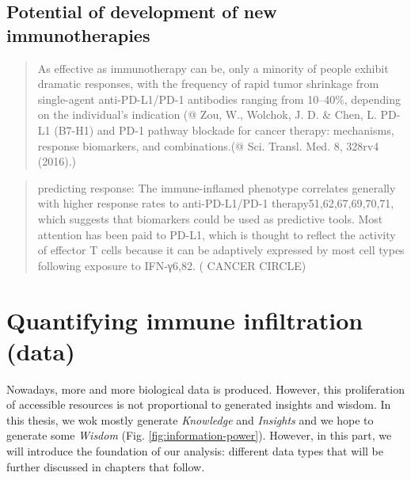 \documentclass[12pt,]{book}
\theoremstyle{definition}
\theoremstyle{definition}
\theoremstyle{definition}
\theoremstyle{remark}
\begin{document}
\hypertarget{potential-of-development-of-new-immunotherapies}{%
\subsection{Potential of development of new
immunotherapies}\label{potential-of-development-of-new-immunotherapies}}

\begin{quote}
As effective as immunotherapy can be, only a minority of people exhibit
dramatic responses, with the frequency of rapid tumor shrinkage from
single-agent anti-PD-L1/PD-1 antibodies ranging from 10--40\%, depending
on the individual's indication (@ Zou, W., Wolchok, J. D. \& Chen, L.
PD-L1 (B7-H1) and PD-1 pathway blockade for cancer therapy: mechanisms,
response biomarkers, and combinations.(@ Sci. Transl. Med. 8, 328rv4
(2016).)
\end{quote}

\begin{quote}
predicting response: The immune-inflamed phenotype correlates generally
with higher response rates to anti-PD-L1/PD-1 therapy51,62,67,69,70,71,
which suggests that biomarkers could be used as predictive tools. Most
attention has been paid to PD-L1, which is thought to reflect the
activity of effector T cells because it can be adaptively expressed by
most cell types following exposure to IFN-γ6,82. (\citet{IMMUNE} CANCER
CIRCLE)
\end{quote}

\hypertarget{quantifying-immune-infiltration-data}{%
\section{Quantifying immune infiltration
(data)}\label{quantifying-immune-infiltration-data}}

Nowadays, more and more biological data is produced. However, this
proliferation of accessible resources is not proportional to generated
insights and wisdom. In this thesis, we wok mostly generate
\emph{Knowledge} and \emph{Insights} and we hope to generate some
\emph{Wisdom} (Fig. \ref{fig:information-power}). However, in this part,
we will introduce the foundation of our analysis: different data types
that will be further discussed in chapters that follow.
\end{document}
